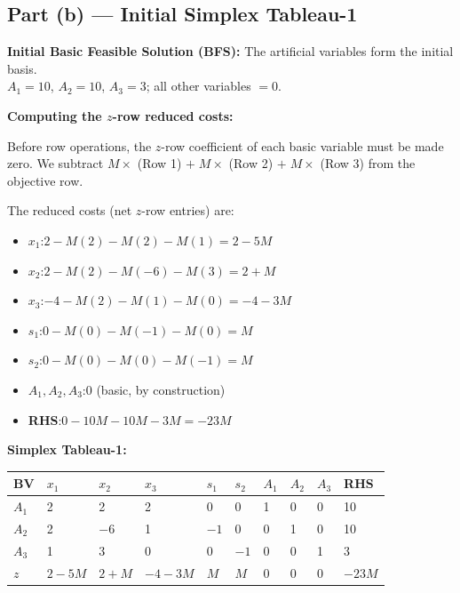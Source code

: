 \documentclass[12pt]{article}
\newcommand{\hcell}[1]{\textbf{\color{white}#1}}
\begin{document}
\newpage

\subsection*{Part (b) --- Initial Simplex Tableau-1}

\begin{conceptbox}
\textbf{Initial Basic Feasible Solution (BFS):}
The artificial variables form the initial basis.\\
$A_1 = 10$, $A_2 = 10$, $A_3 = 3$; all other variables $= 0$.
\end{conceptbox}

\medskip
\noindent\textbf{Computing the $z$-row reduced costs:}

Before row operations, the $z$-row coefficient of each basic variable must be made zero.
We subtract $M \times$ (Row 1) $+\; M \times$ (Row 2) $+\; M \times$ (Row 3) from the
objective row.

The reduced costs (net $z$-row entries) are:

\begin{itemize}[noitemsep, topsep=4pt]
  \item $x_1$:\quad $2 - M(2) - M(2) - M(1) = 2 - 5M$
  \item $x_2$:\quad $2 - M(2) - M(-6) - M(3) = 2 + M$
  \item $x_3$:\quad $-4 - M(2) - M(1) - M(0) = -4 - 3M$
  \item $s_1$:\quad $0 - M(0) - M(-1) - M(0) = M$
  \item $s_2$:\quad $0 - M(0) - M(0) - M(-1) = M$
  \item $A_1, A_2, A_3$:\quad $0$ (basic, by construction)
  \item \textbf{RHS}:\quad $0 - 10M - 10M - 3M = -23M$
\end{itemize}

\medskip
\noindent\textbf{Simplex Tableau-1:}

\begin{center}
\setlength{\tabcolsep}{5pt}
\begin{tabular}{C{1cm} C{1.4cm} C{1.4cm} C{1.4cm} C{1.2cm} C{1.2cm} C{1cm} C{1cm} C{1cm} C{1.4cm}}
\toprule
{}
\hcell{BV} & \hcell{$x_1$} & \hcell{$x_2$} & \hcell{$x_3$} & \hcell{$s_1$} & \hcell{$s_2$} & \hcell{$A_1$} & \hcell{$A_2$} & \hcell{$A_3$} & \hcell{RHS} \\
\midrule
{}
$A_1$ & 2 & 2 & 2 & 0 & 0 & 1 & 0 & 0 & 10 \\
$A_2$ & 2 & $-6$ & 1 & $-1$ & 0 & 0 & 1 & 0 & 10 \\
$A_3$ & 1 & 3 & 0 & 0 & $-1$ & 0 & 0 & 1 & 3 \\
\midrule
$z$   & $2{-}5M$ & $2{+}M$ & $-4{-}3M$ & $M$ & $M$ & 0 & 0 & 0 & $-23M$ \\
\bottomrule
\end{tabular}
\end{center}
\end{document}
